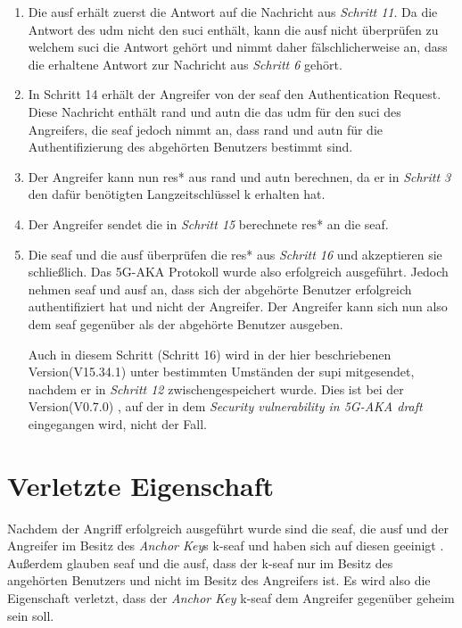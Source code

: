 \begin{enumerate}
\item Die \gls{ausf} erhält zuerst die Antwort auf die Nachricht aus \textit{Schritt 11}.
Da die Antwort des \gls{udm} nicht den \gls{suci} enthält, kann die \gls{ausf} nicht überprüfen zu welchem \gls{suci} die Antwort gehört und nimmt daher fälschlicherweise an, dass die erhaltene Antwort zur Nachricht aus \textit{Schritt 6} gehört.

\item In Schritt 14 erhält der Angreifer von der \gls{seaf} den Authentication Request.
Diese Nachricht enthält \gls{rand} und \gls{autn} die das \gls{udm} für den \gls{suci} des Angreifers, die \gls{seaf} jedoch nimmt an, dass \gls{rand} und \gls{autn} für die Authentifizierung des abgehörten Benutzers bestimmt sind.

\item Der Angreifer kann nun \gls{res*} aus \gls{rand} und \gls{autn} berechnen, da er in \textit{Schritt 3} den dafür benötigten Langzeitschlüssel \gls{k} erhalten hat.

\item Der Angreifer sendet die in \textit{Schritt 15} berechnete \gls{res*} an die \gls{seaf}.

\item Die \gls{seaf} und die \gls{ausf} überprüfen die \gls{res*} aus \textit{Schritt 16} und akzeptieren sie schließlich.
Das 5G-AKA Protokoll wurde also erfolgreich ausgeführt.
Jedoch nehmen \gls{seaf} und \gls{ausf} an, dass sich der abgehörte Benutzer erfolgreich authentifiziert hat und nicht der Angreifer.
Der Angreifer kann sich nun also dem \gls{seaf} gegenüber als der abgehörte Benutzer ausgeben.

Auch in diesem Schritt (Schritt 16) wird in der hier beschriebenen Version(V15.34.1) \cite{3gppTS33.501V15.34.1} unter bestimmten Umständen der \gls{supi} mitgesendet, nachdem er in \textit{Schritt 12} zwischengespeichert wurde.
Dies ist bei der Version(V0.7.0) \cite{3gppTS33.501V0.7.0}, auf der in dem \textit{Security vulnerability in 5G-AKA draft} eingegangen wird, nicht der Fall.


\end{enumerate}


\section{Verletzte Eigenschaft}

Nachdem der Angriff erfolgreich ausgeführt wurde sind die \gls{seaf}, die \gls{ausf} und der Angreifer im Besitz des \textit{Anchor Key}s \gls{k-seaf} und haben sich auf diesen geeinigt \cite{vulnerability}.
Außerdem glauben \gls{seaf} und die \gls{ausf}, dass der \gls{k-seaf} nur im Besitz des angehörten Benutzers und nicht im Besitz des Angreifers ist.
Es wird also die Eigenschaft verletzt, dass der \textit{Anchor Key} \gls{k-seaf} dem Angreifer gegenüber geheim sein soll.

